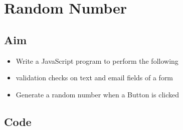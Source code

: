 \documentclass{article}
\begin{document}
\section{Random Number}
\subsection{Aim}
\begin{itemize}
  \item Write a JavaScript program to perform the following
	\item validation checks on text and email fields of a form
	\item Generate a random number when a Button is clicked
\end{itemize}

\subsection{Code}
\inputminted[frame=lines, breaklines, breakanywhere, numberblanklines=false]{html}{./prog_15/index.html}
\end{document}
